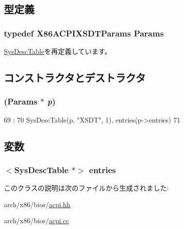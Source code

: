 \subsection{型定義}
\hypertarget{classX86ISA_1_1ACPI_1_1XSDT_aeeb796d6a93a3929cdfc26a772c5cf1a}{
\subsubsection[{Params}]{\setlength{\rightskip}{0pt plus 5cm}typedef X86ACPIXSDTParams {\bf Params}}}
\label{classX86ISA_1_1ACPI_1_1XSDT_aeeb796d6a93a3929cdfc26a772c5cf1a}


\hyperlink{classX86ISA_1_1ACPI_1_1SysDescTable_ad7d44b54d0c12bc9cfd0eea8156c47ba}{SysDescTable}を再定義しています。

\subsection{コンストラクタとデストラクタ}
\hypertarget{classX86ISA_1_1ACPI_1_1XSDT_a6d563b71af01c70e7e54fe470895e93f}{
\subsubsection[{XSDT}]{ ({\bf Params} $\ast$ {\em p})}}
\label{classX86ISA_1_1ACPI_1_1XSDT_a6d563b71af01c70e7e54fe470895e93f}



\begin{DoxyCode}
69                               :
70     SysDescTable(p, "XSDT", 1), entries(p->entries)
71 {}

\end{DoxyCode}


\subsection{変数}
\hypertarget{classX86ISA_1_1ACPI_1_1XSDT_aff927a83490471e964eaa7934ab31edf}{
\subsubsection[{entries}]{$<${\bf SysDescTable} $\ast$$>$ {\bf entries}}}
\label{classX86ISA_1_1ACPI_1_1XSDT_aff927a83490471e964eaa7934ab31edf}


このクラスの説明は次のファイルから生成されました:\begin{DoxyCompactItemize}
\item 
arch/x86/bios/\hyperlink{acpi_8hh}{acpi.hh}\item 
arch/x86/bios/\hyperlink{acpi_8cc}{acpi.cc}\end{DoxyCompactItemize}
